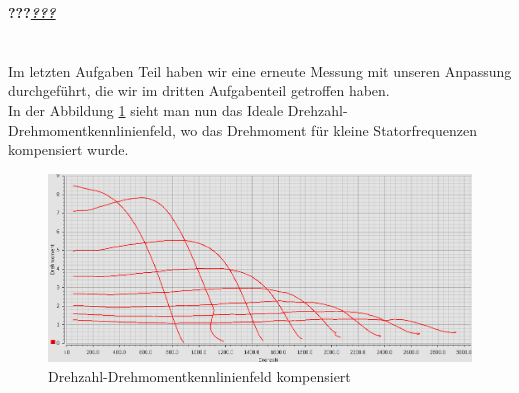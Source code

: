 \textbf{???\textit{\underline{???}}}

\section{}
Im letzten Aufgaben Teil haben wir eine erneute Messung mit unseren Anpassung durchgeführt, die wir im dritten Aufgabenteil getroffen haben.\\
In der Abbildung \ref{fig:7d} sieht man nun das Ideale Drehzahl-Drehmomentkennlinienfeld, wo das Drehmoment für kleine Statorfrequenzen kompensiert wurde.
\begin{figure}[h]
	\centering
	\includegraphics[width=\textwidth]{./Bilder/ele2.png}
	\caption{Drehzahl-Drehmomentkennlinienfeld kompensiert}
	\label{fig:7d}
\end{figure}